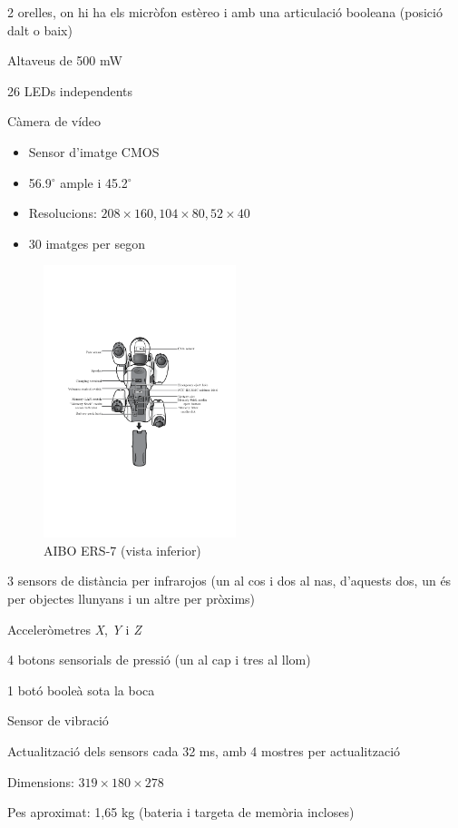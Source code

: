 \documentclass[12pt,a4paper,final,twoside]{report}
\begin{document}
\begin{itemize}
\begin{minipage}[t]{\textwidth}
\item 2 orelles, on hi ha els micròfon estèreo i amb una articulació booleana (posició dalt o baix)
\item Altaveus de 500 mW
\item 26 LEDs independents
\item Càmera de vídeo
\begin{itemize}
\item Sensor d'imatge CMOS
\item 56.9$^{\circ}$ ample i 45.2$^{\circ}$
\item Resolucions: $208\times160, 104\times80, 52\times40$
\item 30 imatges per segon
\end{itemize}
\end{minipage}

\begin{minipage}[t]{\textwidth}
\begin{figure}
        			\includegraphics[width=0.5\textwidth]{Imatges/ERS-7(stomach).pdf}
                \caption{AIBO ERS-7 (vista inferior) \cite{Aibo_Images}}
\end{figure}
\item 3 sensors de distància per infrarojos (un al cos i dos al nas, d'aquests dos, un és per objectes llunyans i un altre per pròxims)
\item Acceleròmetres \textit{X}, \textit{Y} i \textit{Z}
\item 4 botons sensorials de pressió (un al cap i tres al llom)
\item 1 botó booleà sota la boca
\item Sensor de vibració
\item Actualització dels sensors cada 32 ms, amb 4 mostres per actualització
\item Dimensions: $319\times180\times278$
\item Pes aproximat: 1,65 kg (bateria i targeta de memòria incloses)
\end{minipage}
\end{itemize}
\end{document}
